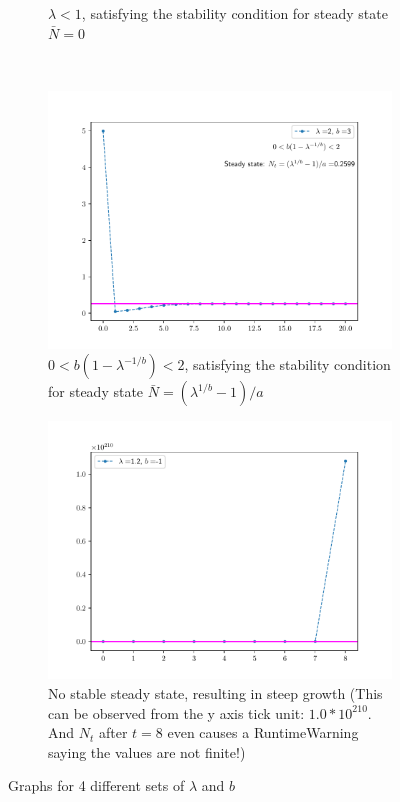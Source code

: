 \begin{homeworkProblem}
\begin{figure}[htbp]
\begin{subfigure}[t]{0.45\linewidth}
    \caption{$\lambda < 1$, satisfying the stability
    condition for steady state $\bar N = 0$}
\end{subfigure}
\\
\begin{subfigure}[t]{0.45\linewidth}
    \includegraphics[scale = 0.5]{fig/fig8(c)(3).pdf}
    \caption{$0 < b(1-\lambda^{-1/b})<2$, satisfying the stability
    condition for steady state $\bar N = (\lambda^{1/b} - 1)/a$}
\end{subfigure}
\hfill
\begin{subfigure}[t]{0.45\linewidth}
    \includegraphics[scale = 0.5]{fig/fig8(c)(4).pdf}
    \caption{No stable steady state, resulting in steep growth (This can be 
    observed from the y axis tick unit: $1.0*10^{210}$. And $N_t$ after 
    $t = 8$ even causes a RuntimeWarning saying the values are not finite!)}
\end{subfigure}
\caption{Graphs for 4 different sets of $\lambda$ and $b$}
\end{figure}
\end{homeworkProblem}